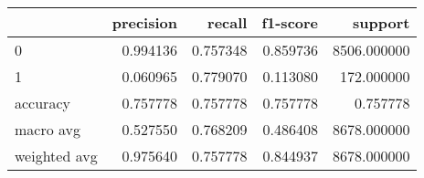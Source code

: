 \begin{tabular}{lrrrr}
\toprule
{} &  precision &    recall &  f1-score &      support \\
\midrule
0            &   0.994136 &  0.757348 &  0.859736 &  8506.000000 \\
1            &   0.060965 &  0.779070 &  0.113080 &   172.000000 \\
accuracy     &   0.757778 &  0.757778 &  0.757778 &     0.757778 \\
macro avg    &   0.527550 &  0.768209 &  0.486408 &  8678.000000 \\
weighted avg &   0.975640 &  0.757778 &  0.844937 &  8678.000000 \\
\bottomrule
\end{tabular}
